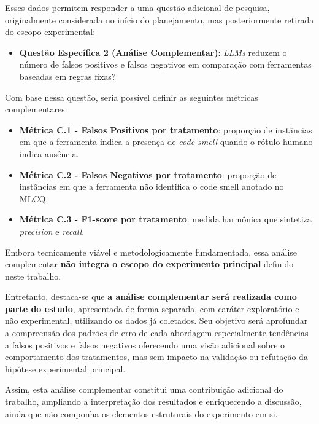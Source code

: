 Esses dados permitem responder a uma questão adicional de pesquisa, originalmente
considerada no início do planejamento, mas posteriormente retirada do escopo experimental:

\begin{itemize}
    \item \textbf{Questão Específica 2 (Análise Complementar)}: 
    \textit{LLMs} reduzem o número de falsos positivos e falsos negativos em comparação com 
    ferramentas baseadas em regras fixas?
\end{itemize}

Com base nessa questão, seria possível definir as seguintes métricas complementares:

\begin{itemize}
    \item \textbf{Métrica C.1 - Falsos Positivos por tratamento}: proporção de instâncias em que 
    a ferramenta indica a presença de \textit{code smell} quando o rótulo humano indica ausência.

    \item \textbf{Métrica C.2 - Falsos Negativos por tratamento}: proporção de instâncias em que 
    a ferramenta não identifica o code smell anotado no MLCQ.

    \item \textbf{Métrica C.3 - F1-score por tratamento}: medida harmônica que sintetiza 
    \textit{precision} e \textit{recall}.
\end{itemize}

Embora tecnicamente viável e metodologicamente fundamentada, essa análise complementar 
\textbf{não integra o escopo do experimento principal} definido neste trabalho.

Entretanto, destaca-se que \textbf{a análise complementar será realizada como parte do estudo}, 
apresentada de forma separada, com caráter exploratório e não experimental, utilizando os 
dados já coletados. Seu objetivo será aprofundar a compreensão dos padrões de erro de cada 
abordagem especialmente tendências a falsos positivos e falsos negativos oferecendo 
uma visão adicional sobre o comportamento dos tratamentos, mas sem impacto na validação ou 
refutação da hipótese experimental principal.

Assim, esta análise complementar constitui uma contribuição adicional do trabalho, ampliando a 
interpretação dos resultados e enriquecendo a discussão, ainda que não componha os elementos 
estruturais do experimento em si.
